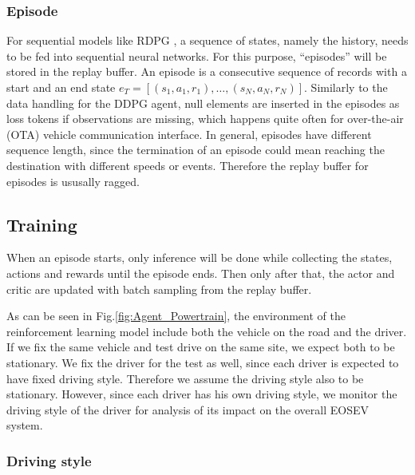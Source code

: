 \documentclass{article}
\begin{document}
\subsubsection{Episode}\label{sec:episode}

For sequential models like RDPG \parencite{heess15:_memor}, a sequence of states, namely the history, needs to be fed into sequential neural networks. For this purpose, ``episodes'' will be stored in the replay buffer. An episode is a consecutive sequence of records with a start and an end state $e_T=[(s_1,a_1,r_1),\ldots,(s_{N},a_{N},r_{N})]$. Similarly to the data handling for the DDPG agent, null elements are inserted in the episodes as loss tokens if observations are missing, which happens quite often for over-the-air (OTA) vehicle communication interface. In general, episodes have different sequence length, since the termination of an episode could mean reaching the destination with different speeds or events. Therefore the replay buffer for episodes is ususally ragged.

\subsection{Training}\label{sec:training}

When an episode starts, only inference will be done while collecting the states, actions and rewards until the episode ends. Then only after that, the actor and critic are updated with batch sampling from the replay buffer.

As can be seen in Fig.\@\ref{fig:Agent_Powertrain}, the environment of the reinforcement learning model include both the vehicle on the road and the driver. If we fix the same vehicle and test drive on the same site, we expect both to be stationary. We fix the driver for the test as well, since each driver is expected to have fixed driving style. Therefore we assume the driving style also to be stationary. However, since each driver has his own driving style, we monitor the driving style of the driver for analysis of its impact on the overall EOSEV system.

\subsubsection{Driving style}\label{sec:driving style}
\end{document}
